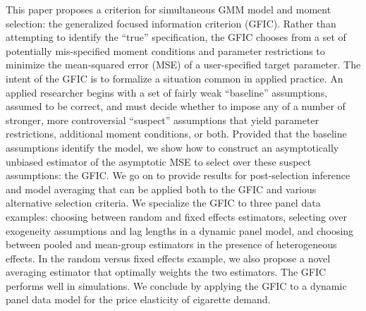 This paper proposes a criterion for simultaneous GMM model and moment selection: the generalized focused information criterion (GFIC). 
Rather than attempting to identify the ``true'' specification, the GFIC chooses from a set of potentially mis-specified moment conditions and parameter restrictions to minimize the mean-squared error (MSE) of a user-specified target parameter.
The intent of the GFIC is to formalize a situation common in applied practice.
An applied researcher begins with a set of fairly weak ``baseline'' assumptions, assumed to be correct, and must decide whether to impose any of a number of stronger, more controversial ``suspect'' assumptions that yield parameter restrictions, additional moment conditions, or both.
Provided that the baseline assumptions identify the model, we show how to construct an asymptotically unbiased estimator of the asymptotic MSE to select over these suspect assumptions: the GFIC. 
We go on to provide results for post-selection inference and model averaging that can be applied both to the GFIC and various alternative selection criteria.
We specialize the GFIC to three panel data examples: choosing between random and fixed effects estimators, selecting over exogeneity assumptions and lag lengths in a dynamic panel model, and choosing between pooled and mean-group estimators in the presence of heterogeneous effects. 
In the random versus fixed effects example, we also propose a novel averaging estimator that optimally weights the two estimators.
The GFIC performs well in simulations. 
We conclude by applying the GFIC to a dynamic panel data model for the price elasticity of cigarette demand. 

